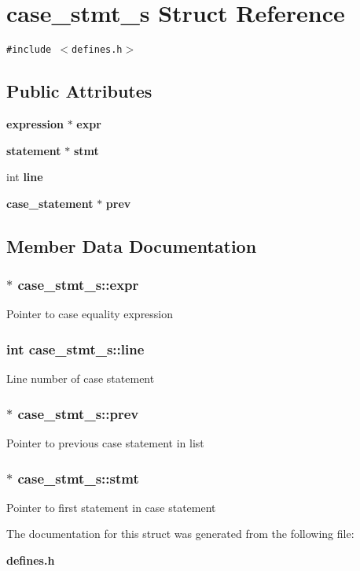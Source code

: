 \section{case\_\-stmt\_\-s Struct Reference}
\label{structcase__stmt__s}
{\tt \#include $<$defines.h$>$}

\subsection*{Public Attributes}
\begin{CompactItemize}
\item 
{\bf expression} $\ast$ {\bf expr}
\item 
{\bf statement} $\ast$ {\bf stmt}
\item 
int {\bf line}
\item 
{\bf case\_\-statement} $\ast$ {\bf prev}
\end{CompactItemize}


\subsection{Member Data Documentation}
\subsubsection{$\ast$ case\_\-stmt\_\-s::expr}\label{structcase__stmt__s_m0}


Pointer to case equality expression 
\subsubsection{\setlength{\rightskip}{0pt plus 5cm}int case\_\-stmt\_\-s::line}\label{structcase__stmt__s_m2}


Line number of case statement 
\subsubsection{$\ast$ case\_\-stmt\_\-s::prev}\label{structcase__stmt__s_m3}


Pointer to previous case statement in list 
\subsubsection{$\ast$ case\_\-stmt\_\-s::stmt}\label{structcase__stmt__s_m1}


Pointer to first statement in case statement 

The documentation for this struct was generated from the following file:\begin{CompactItemize}
\item 
{\bf defines.h}\end{CompactItemize}
